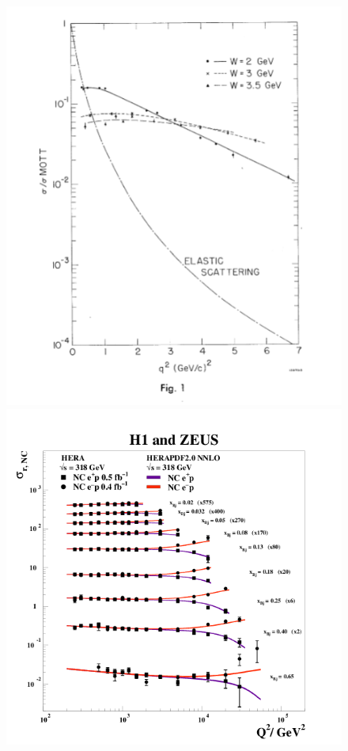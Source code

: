 \documentclass[12pt]{article}
\begin{document}
\begin{figure}[h]
\begin{center}
\includegraphics[scale=0.5,trim=1cm 1cm 1cm 1cm]{images/DISq2dep.png}
\includegraphics[scale=0.45]{images/HeraStructureFunction.png}

\end{center}
\end{figure}
\end{document}
